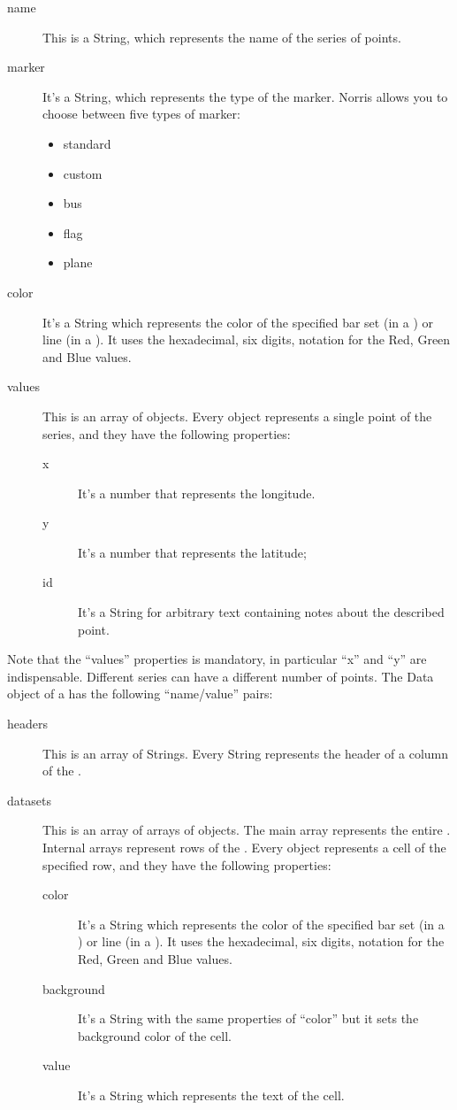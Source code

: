 				\begin{description}
					\item[name] This is a String, which represents the name of the series of points.
					\item[marker] It's a String, which represents the type of the marker. Norris allows you to choose between five types of marker:
					\begin{itemize}
					  \item standard
					  \item custom
					  \item bus
					  \item flag
					  \item plane
					\end{itemize}
					\item[color] It's a String which represents the color of the specified bar set (in a ) or line (in a ). It uses the hexadecimal, six digits, notation for the Red, Green and Blue values. 
					\item[values] This is an array of objects. Every object represents a single point of the series, and they have the following properties:
						\begin{description}
							\item[x] It's a number that represents the longitude.
							\item[y] It's a number that represents the latitude;
							\item[id] It's a String for arbitrary text containing notes about the described point.
						\end{description}
				\end{description}
				Note that the “values” properties is mandatory, in particular “x” and “y” are indispensable. Different series can have a different number of points.
				The Data object of a  has the following “name/value” pairs:
				\begin{description}
					\item[headers] This is an array of Strings. Every String represents the header of a column of the .
					\item[datasets] This is an array of arrays of objects. The main array represents the entire . Internal arrays represent rows of the . Every object represents a cell of the specified row, and they have the following properties:
					\begin{description}
						\item[color] It's a String which represents the color of the specified bar set (in a ) or line (in a ). It uses the hexadecimal, six digits, notation for the Red, Green and Blue values. 
						\item[background] It's a String with the same properties of “color” but it sets the background color of the cell.
						\item[value] It's a String which represents the text of the cell.
					\end{description}
				\end{description}
